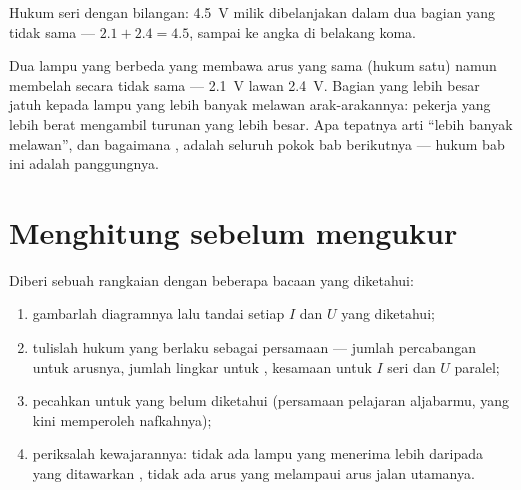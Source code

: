 \begin{omfigure}

{\small Hukum  seri dengan bilangan: \qty{4.5}{V} milik
 dibelanjakan dalam dua bagian yang tidak sama --- $2.1 + 2.4 =
4.5$, sampai ke angka di belakang koma.}
\end{omfigure}

\begin{example}\label{ex:g8:circuit-laws:unequal}
Dua lampu yang berbeda yang  membawa arus yang sama
(hukum satu) namun membelah  secara tidak sama ---
\qty{2.1}{V} lawan \qty{2.4}{V}. Bagian yang lebih besar jatuh kepada
lampu yang lebih banyak melawan arak-arakannya: pekerja yang lebih
berat mengambil turunan yang lebih besar. Apa tepatnya arti ``lebih
banyak melawan'', dan bagaimana , adalah seluruh pokok bab
berikutnya --- hukum bab ini adalah panggungnya.
\end{example}

\section{Menghitung sebelum mengukur}

\begin{method}\label{met:g8:circuit-laws:solve}
Diberi sebuah rangkaian dengan beberapa bacaan yang diketahui:
\begin{enumerate}
  \item gambarlah diagramnya lalu tandai setiap $I$ dan $U$ yang
        diketahui;
  \item tulislah hukum yang berlaku sebagai persamaan --- jumlah
        percabangan untuk arusnya, jumlah lingkar untuk ,
        kesamaan untuk $I$ seri dan $U$ paralel;
  \item pecahkan untuk yang belum diketahui (persamaan pelajaran
        aljabarmu, yang kini memperoleh nafkahnya);
  \item periksalah kewajarannya: tidak ada lampu yang menerima lebih
        daripada yang ditawarkan , tidak ada arus 
        yang melampaui arus jalan utamanya.
\end{enumerate}
\end{method}

